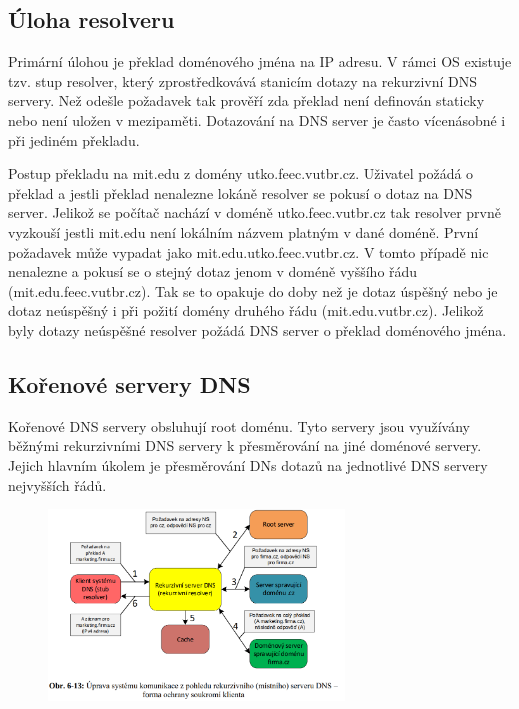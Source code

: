 \subsection{Úloha resolveru}

Primární úlohou je překlad doménového jména na IP adresu.
V rámci OS existuje tzv. stup resolver, který zprostředkovává stanicím dotazy na rekurzivní DNS servery.
Než odešle požadavek tak prověří zda překlad není definován staticky nebo není uložen v mezipaměti.
Dotazování na DNS server je často vícenásobné i při jediném překladu.

Postup překladu na mit.edu z domény utko.feec.vutbr.cz.
Uživatel požádá o překlad a jestli překlad nenalezne lokáně resolver se pokusí o dotaz na DNS server.
Jelikož se počítač nachází v doméně utko.feec.vutbr.cz tak resolver prvně vyzkouší jestli mit.edu není lokálním názvem platným v dané doméně.
První požadavek může vypadat jako mit.edu.utko.feec.vutbr.cz.
V tomto případě nic nenalezne a pokusí se o stejný dotaz jenom v doméně vyššího řádu (mit.edu.feec.vutbr.cz).
Tak se to opakuje do doby než je dotaz úspěšný nebo je dotaz neúspěšný i při požití domény druhého řádu (mit.edu.vutbr.cz).
Jelikož byly dotazy neúspěšné resolver požádá DNS server o překlad doménového jména.

\subsection{Kořenové servery DNS}

Kořenové DNS servery obsluhují root doménu.
Tyto servery jsou využívány běžnými rekurzivními DNS servery k přesměrování na jiné doménové servery.
Jejich hlavním úkolem je přesměrování DNs dotazů na jednotlivé DNS servery nejvyšších řádů.

\begin{figure}[!h]
    \centering
    \includegraphics[width=0.7\textwidth]{obrazky/040.png}
\end{figure}

